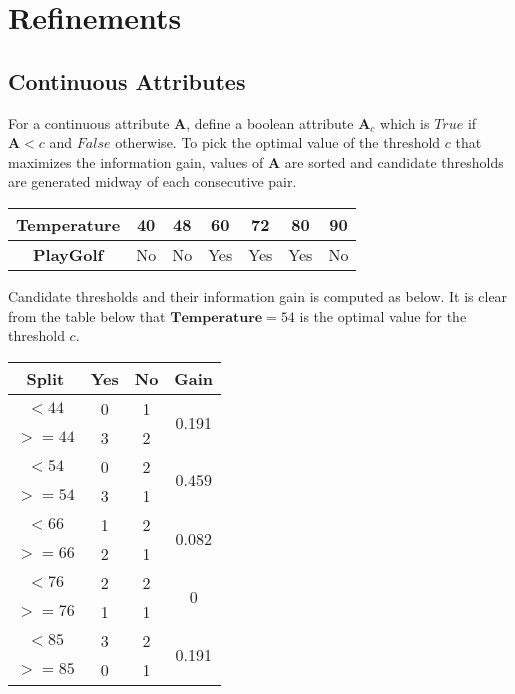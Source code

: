 \documentclass[11pt, a4paper]{article}
\begin{document}
\section{Refinements}

\subsection{Continuous Attributes} 

For a continuous attribute $\textbf{A}$, define a boolean attribute $\textbf{A}_c$ which is $True$ if $\textbf{A} < c$ and $False$ otherwise. To pick the optimal value of the threshold $c$ that maximizes the information gain, values of $\textbf{A}$ are sorted and candidate thresholds are generated midway of each consecutive pair.  


\begin{table}[h]
	\centering
	\begin{tabular}{c|cccccc}
		\toprule
		\textbf{Temperature} & 40 & 48 & 60  & 72  & 80  & 90 \\
		\midrule
		\textbf{PlayGolf}    & No & No & Yes & Yes & Yes & No \\
	\end{tabular}
\end{table}

Candidate thresholds and their information gain is computed as below. It is clear from the table below that $\textbf{Temperature} = 54$ is the optimal value for the threshold $c$.

\FloatBarrier
\begin{table}
	\centering
	\begin{tabular}{ |c|c|c|c| }
		\hline
		\textbf{Split} & \textbf{Yes} & \textbf{No} & \textbf{Gain}                     \\ 
		\hline
		$< 44$         & 0            & 1           & \multirow{2}{*}{0.191}            \\
		$>= 44$        & 3            & 2           &                                   \\
		\hline
		$< 54$         & 0            & 2           & \multirow{2}{*}{$\mathbf{0.459}$} \\
		$>= 54$        & 3            & 1           &                                   \\
		\hline
		$< 66$         & 1            & 2           & \multirow{2}{*}{0.082}            \\
		$>= 66$        & 2            & 1           &                                   \\
		\hline
		$< 76$         & 2            & 2           & \multirow{2}{*}{0}                \\
		$>= 76$        & 1            & 1           &                                   \\
		\hline
		$< 85$         & 3            & 2           & \multirow{2}{*}{0.191}            \\
		$>= 85$        & 0            & 1           &                                   \\
		\hline
	\end{tabular}
\end{table}
\end{document}
